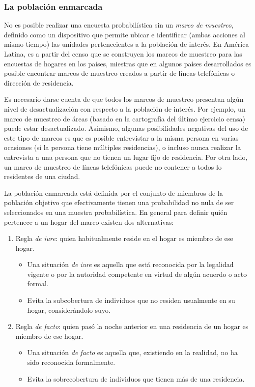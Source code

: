 \documentclass[
  12pt,
]{book}
\providecommand{\tightlist}{%
  \setlength{\itemsep}{0pt}\setlength{\parskip}{0pt}}
\begin{document}
\hypertarget{la-poblaciuxf3n-enmarcada}{%
\subsubsection{La población enmarcada}\label{la-poblaciuxf3n-enmarcada}}

No es posible realizar una encuesta probabilística sin un \emph{marco de muestreo}, definido como un dispositivo que permite ubicar e identificar (ambas acciones al mismo tiempo) las unidades pertenecientes a la población de interés. En América Latina, es a partir del censo que se construyen los marcos de muestreo para las encuestas de hogares en los países, miestras que en algunos países desarrollados es posible encontrar marcos de muestreo creados a partir de líneas telefónicas o dirección de residencia.

Es necesario darse cuenta de que todos los marcos de muestreo presentan algún nivel de desactualización con respecto a la población de interés. Por ejemplo, un marco de muestreo de áreas (basado en la cartografía del último ejercicio censa) puede estar desactualizado. Asimismo, algunas posibilidades negativas del uso de este tipo de marcos es que es posible entrevistar a la misma persona en varias ocasiones (si la persona tiene múltiples residencias), o incluso nunca realizar la entrevista a una persona que no tienen un lugar fijo de residencia. Por otra lado, un marco de muestreo de líneas telefónicas puede no contener a todos lo residentes de una ciudad.

La población enmarcada está definida por el conjunto de miembros de la población objetivo que efectivamente tienen una probabilidad no nula de ser seleccionados en una muestra probabilística. En general para definir quién pertenece a un hogar del marco existen dos alternativas:

\begin{enumerate}
\def\labelenumi{\arabic{enumi}.}
\tightlist
\item
  Regla \emph{de iure}: quien habitualmente reside en el hogar es miembro de ese hogar.

  \begin{itemize}
  \tightlist
  \item
    Una situación \emph{de iure} es aquella que está reconocida por la legalidad vigente o por la autoridad competente en virtud de algún acuerdo o acto formal.
  \item
    Evita la subcobertura de individuos que no residen usualmente en su hogar, considerándolo suyo.
  \end{itemize}
\item
  Regla \emph{de facto}: quien pasó la noche anterior en una residencia de un hogar es miembro de ese hogar.

  \begin{itemize}
  \tightlist
  \item
    Una situación \emph{de facto} es aquella que, existiendo en la realidad, no ha sido reconocida formalmente.
  \item
    Evita la sobrecobertura de individuos que tienen más de una residencia.
  \end{itemize}
\end{enumerate}
\end{document}
